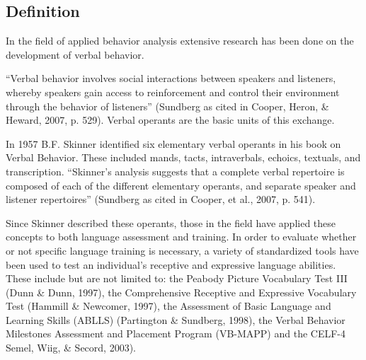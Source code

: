 \subsection{Definition}
In the field of applied behavior analysis extensive research has been done on the development of verbal behavior.  

``Verbal behavior involves social interactions between speakers and listeners, whereby speakers gain access to reinforcement and control their environment through the behavior of listeners'' (Sundberg as cited in Cooper, Heron, \& Heward, 2007, p. 529). Verbal operants are the basic units of this exchange.  

In 1957 B.F. Skinner identified six elementary verbal operants in his book on Verbal Behavior.  These included mands, tacts, intraverbals, echoics, textuals, and transcription.  ``Skinner's analysis suggests that a complete verbal repertoire is composed of each of the different elementary operants, and separate speaker and listener repertoires'' (Sundberg as cited in Cooper, et al., 2007, p. 541).   

Since Skinner described these operants, those in the field have applied these concepts to both language assessment and training.  In order to evaluate whether or not specific language training is necessary, a variety of standardized tools have been used to test an individual's receptive and expressive language abilities.  These include but are not limited to: the Peabody Picture Vocabulary Test III (Dunn \& Dunn, 1997), the Comprehensive Receptive and Expressive Vocabulary Test (Hammill \& Newcomer, 1997), the Assessment of Basic Language and Learning Skills (ABLLS) (Partington \& Sundberg, 1998), the Verbal Behavior Milestones Assessment and Placement Program (VB-MAPP) and the CELF-4 Semel, Wiig, \& Secord, 2003).  

